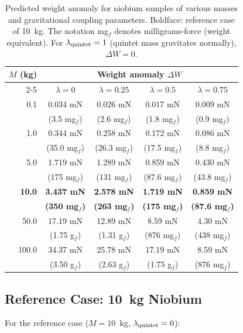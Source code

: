 \documentclass[12pt,a4paper]{article}
\theoremstyle{definition}
\theoremstyle{remark}
\begin{document}
\begin{table}[h]
\centering
\renewcommand{\arraystretch}{1.3}
\begin{tabular}{rcccc}
\toprule
\textbf{$M$ (kg)} & \multicolumn{4}{c}{\textbf{Weight anomaly $\Delta W$}} \\
\cmidrule{2-5}
& $\lambda = 0$ & $\lambda = 0.25$ & $\lambda = 0.5$ & $\lambda = 0.75$ \\
\midrule
0.1 & 0.034 mN & 0.026 mN & 0.017 mN & 0.009 mN \\
    & (3.5 mg$_f$) & (2.6 mg$_f$) & (1.8 mg$_f$) & (0.9 mg$_f$) \\[4pt]
1.0 & 0.344 mN & 0.258 mN & 0.172 mN & 0.086 mN \\
    & (35.0 mg$_f$) & (26.3 mg$_f$) & (17.5 mg$_f$) & (8.8 mg$_f$) \\[4pt]
5.0 & 1.719 mN & 1.289 mN & 0.859 mN & 0.430 mN \\
    & (175 mg$_f$) & (131 mg$_f$) & (87.6 mg$_f$) & (43.8 mg$_f$) \\[4pt]
\textbf{10.0} & \textbf{3.437 mN} & \textbf{2.578 mN} & \textbf{1.719 mN} & \textbf{0.859 mN} \\
    & \textbf{(350 mg$_f$)} & \textbf{(263 mg$_f$)} & \textbf{(175 mg$_f$)} & \textbf{(87.6 mg$_f$)} \\[4pt]
50.0 & 17.19 mN & 12.89 mN & 8.59 mN & 4.30 mN \\
    & (1.75 g$_f$) & (1.31 g$_f$) & (876 mg$_f$) & (438 mg$_f$) \\[4pt]
100.0 & 34.37 mN & 25.78 mN & 17.19 mN & 8.59 mN \\
    & (3.50 g$_f$) & (2.63 g$_f$) & (1.75 g$_f$) & (876 mg$_f$) \\
\bottomrule
\end{tabular}
\caption{Predicted weight anomaly for niobium samples of various masses and
gravitational coupling parameters.  Boldface: reference case of 10~kg.
The notation mg$_f$ denotes milligrams-force (weight equivalent).
For $\lambda_{\rm quintet} = 1$ (quintet mass gravitates normally), $\Delta W = 0$.}
\label{tab:forces}
\end{table}

\subsection{Reference Case: 10~kg Niobium}

For the reference case ($M = 10$~kg, $\lambda_{\rm quintet} = 0$):
\end{document}
